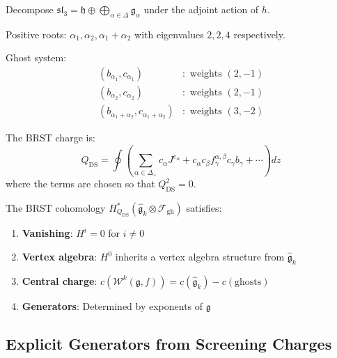 \begin{construction}\label{const:brst-sl3}
Decompose $\mathfrak{sl}_3 = \mathfrak{h} \oplus \bigoplus_{\alpha \in \Delta} \mathfrak{g}_\alpha$ under the adjoint action of $h$.

Positive roots: $\alpha_1, \alpha_2, \alpha_1 + \alpha_2$ with eigenvalues $2, 2, 4$ respectively.

Ghost system:
\begin{align}
(b_{\alpha_1}, c_{\alpha_1}) &: \text{ weights } (2, -1) \\
(b_{\alpha_2}, c_{\alpha_2}) &: \text{ weights } (2, -1) \\
(b_{\alpha_1+\alpha_2}, c_{\alpha_1+\alpha_2}) &: \text{ weights } (3, -2)
\end{align}

The BRST charge is:
\begin{equation}
Q_{\text{DS}} = \oint \left( \sum_{\alpha \in \Delta_+} c_\alpha J^{e_\alpha} + c_\alpha c_\beta f^{\alpha,\beta}_\gamma c_\gamma b_\gamma + \cdots \right) dz
\end{equation}
where the terms are chosen so that $Q_{\text{DS}}^2 = 0$.
\end{construction}

\begin{theorem}\label{thm:brst-properties}
The BRST cohomology $H^*_{Q_{\text{DS}}}(\widehat{\mathfrak{g}}_k \otimes \mathcal{F}_{\text{gh}})$ satisfies:
\begin{enumerate}
\item \textbf{Vanishing}: $H^i = 0$ for $i \neq 0$
\item \textbf{Vertex algebra}: $H^0$ inherits a vertex algebra structure from $\widehat{\mathfrak{g}}_k$
\item \textbf{Central charge}: $c(\mathcal{W}^k(\mathfrak{g}, f)) = c(\widehat{\mathfrak{g}}_k) - c(\text{ghosts})$
\item \textbf{Generators}: Determined by exponents of $\mathfrak{g}$
\end{enumerate}
\end{theorem}

\subsection{Explicit Generators from Screening Charges}

